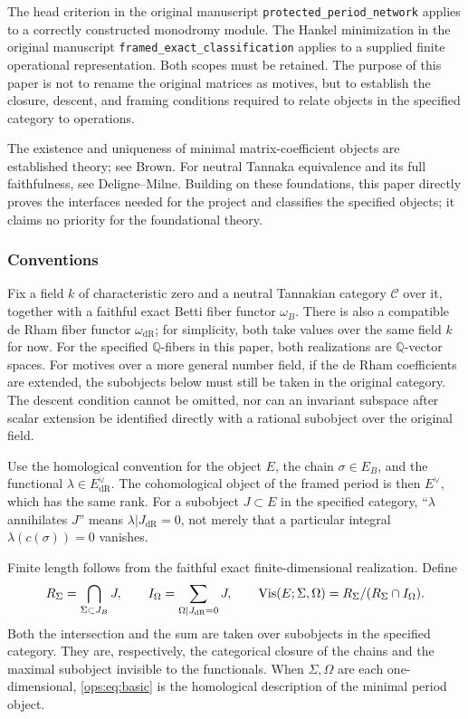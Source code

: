 \documentclass[11pt,a4paper,oneside]{article}
\theoremstyle{plain}
\theoremstyle{definition}
\theoremstyle{remark}
\newcommand{\Q}{\mathbb Q}
\newcommand{\dR}{\mathrm{dR}}
\numberwithin{equation}{section}
\begin{document}
The head criterion in the original manuscript \nolinkurl{protected_period_network} applies to a correctly constructed monodromy module.
The Hankel minimization in the original manuscript \nolinkurl{framed_exact_classification} applies to a supplied finite operational representation.
Both scopes must be retained. The purpose of this paper is not to rename the original matrices as motives,
but to establish the closure, descent, and framing conditions required to relate objects in the specified category to operations.

The existence and uniqueness of minimal matrix-coefficient objects are established theory; see Brown\cite[\S2.4]{brownperiods}.
For neutral Tannaka equivalence and its full faithfulness, see Deligne--Milne\cite[Theorem 2.11]{delignemilne}.
Building on these foundations, this paper directly proves the interfaces needed for the project and classifies the specified objects; it claims no priority for the foundational theory.

\subsubsection{Conventions}
Fix a field $k$ of characteristic zero and a neutral Tannakian category $\mathcal C$ over it,
together with a faithful exact Betti fiber functor $\omega_B$.
There is also a compatible de Rham fiber functor $\omega_{\dR}$; for simplicity, both take values over the same field $k$ for now.
For the specified $\Q$-fibers in this paper, both realizations are $\Q$-vector spaces.
For motives over a more general number field, if the de Rham coefficients are extended, the subobjects below must still be taken in the original category.
The descent condition cannot be omitted, nor can an invariant subspace after scalar extension be identified directly with a rational subobject over the original field.

Use the homological convention for the object $E$, the chain $\sigma\in E_B$, and the functional
$\lambda\in E_{\dR}^{\vee}$. The cohomological object of the framed period is then $E^\vee$,
which has the same rank. For a subobject $J\subset E$ in the specified category,
``$\lambda$ annihilates $J$'' means $\lambda|J_{\dR}=0$,
not merely that a particular integral $\lambda(c(\sigma))=0$ vanishes.

Finite length follows from the faithful exact finite-dimensional realization. Define
\begin{equation}\label{ops:eq:basic}
 R_\Sigma=\bigcap_{\Sigma\subset J_B}J,
 \qquad I_\Omega=\sum_{\Omega|J_{\dR}=0}J,
 \qquad \Vis(E;\Sigma,\Omega)=R_\Sigma/(R_\Sigma\cap I_\Omega).
\end{equation}
Both the intersection and the sum are taken over subobjects in the specified category. They are, respectively, the categorical closure of the chains and the maximal subobject invisible to the functionals.
When $\Sigma,\Omega$ are each one-dimensional, \eqref{ops:eq:basic} is the homological description of the minimal period object.
\end{document}
